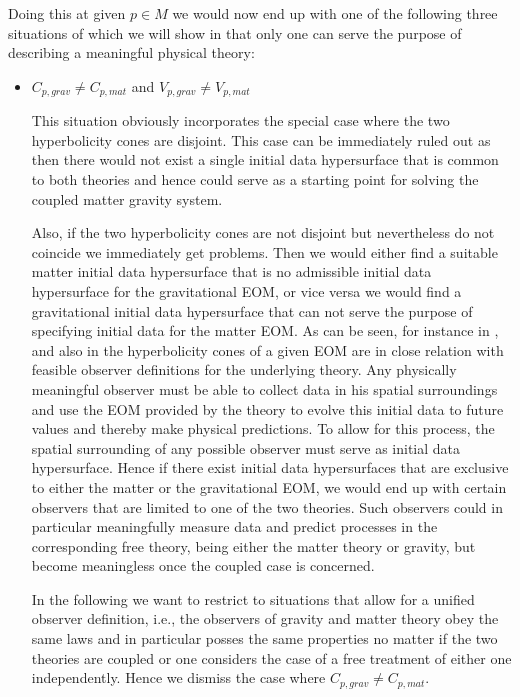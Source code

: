 Doing this at given $p \in M$ we would now end up with one of the following three situations of which we will show in that only one can serve the purpose of describing a meaningful physical theory:
\begin{itemize}
    \item $C_{p,grav} \neq C_{p,mat}$ and $V_{p,grav} \neq V_{p,mat}$
    
This situation obviously incorporates the special case where the two hyperbolicity cones are disjoint. This case can be immediately ruled out as then there would not exist a single initial data hypersurface that is common to both theories and hence could serve as a starting point for solving the coupled matter gravity system.   

Also, if the two hyperbolicity cones are not disjoint but nevertheless do not coincide we immediately get problems. Then we would either find a suitable matter initial data hypersurface that is no admissible initial data hypersurface for the gravitational EOM, or vice versa we would find a gravitational initial data hypersurface that can not serve the purpose of specifying initial data for the matter EOM. As can be seen, for instance in \cite{Rivera}, and also in \cite{2011PhRvD..83d4047R} the hyperbolicity cones of a given EOM are in close relation with feasible observer definitions for the underlying theory. Any physically meaningful observer must be able to collect data in his spatial surroundings and use the EOM provided by the theory to evolve this initial data to future values and thereby make physical predictions. To allow for this process, the spatial surrounding of any possible observer must serve as initial data hypersurface. Hence if there exist initial data hypersurfaces that are exclusive to either the matter or the gravitational EOM, we would end up with certain observers that are limited to one of the two theories. Such observers could in particular meaningfully measure data and predict processes in the corresponding free theory, being either the matter theory or gravity, but become meaningless once the coupled case is concerned.

In the following we want to restrict to situations that allow for a unified observer definition, i.e., the observers of gravity and matter theory obey the same laws and in particular posses the same properties no matter if the two theories are coupled or one considers the case of a free treatment of either one independently. Hence we dismiss the case where $C_{p,grav} \neq C_{p,mat}$.


\end{itemize}
